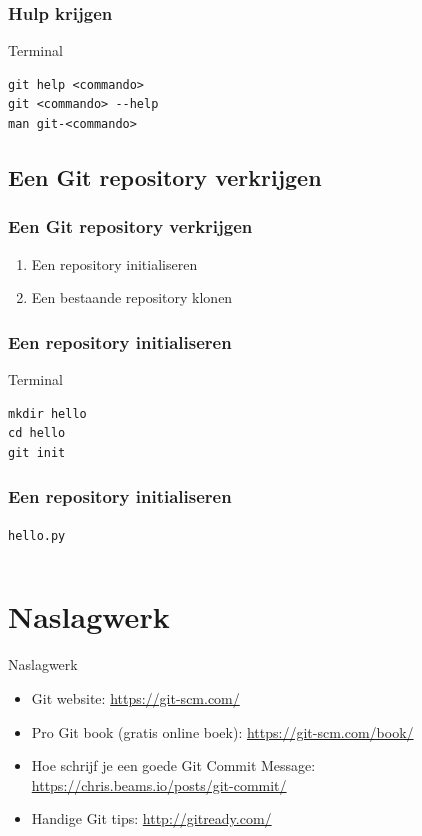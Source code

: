 \documentclass[]{beamer}
\begin{document}
\begin{frame}[fragile]
    \frametitle{Hulp krijgen}

    \begin{block}{Terminal}
\begin{verbatim}
git help <commando>
git <commando> --help
man git-<commando>
\end{verbatim}
    \end{block}
\end{frame}

\subsection{Een Git repository verkrijgen}

\begin{frame}
    \frametitle{Een Git repository verkrijgen}

    \begin{enumerate}
        \item Een repository initialiseren
        \item Een bestaande repository klonen
    \end{enumerate}
\end{frame}

\begin{frame}[fragile]
    \frametitle{Een repository initialiseren}

    \begin{block}{Terminal}
\begin{verbatim}
mkdir hello
cd hello
git init
\end{verbatim}
    \end{block}
\end{frame}

\begin{frame}[fragile]
    \frametitle{Een repository initialiseren}

	\texttt{hello.py}
	\inputminted{python}{source/hello.py}
\end{frame}

\section*{Naslagwerk}

\begin{frame}{Naslagwerk}
    \begin{itemize}
    \item Git website: \url{https://git-scm.com/}
    \item Pro Git book (gratis online boek): \url{https://git-scm.com/book/}
    \item Hoe schrijf je een goede Git Commit Message: \url{https://chris.beams.io/posts/git-commit/}
    \item Handige Git tips: \url{http://gitready.com/}
    \end{itemize}
\end{frame}
\end{document}
